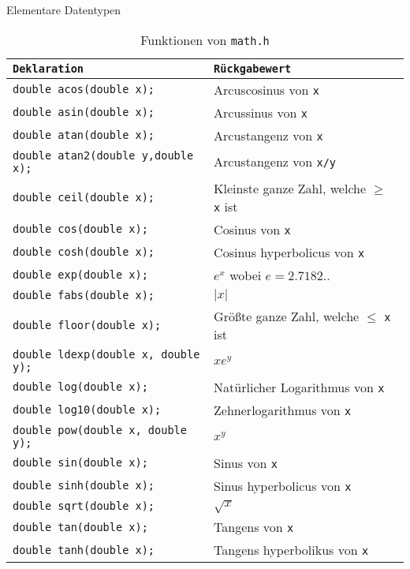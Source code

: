 \begin{table}[t]
\caption{Elementare Datentypen\label{tabelle1}}  %
\centering
\begin{tabular}{|l l|}
\hline
\texttt{Deklaration} & \texttt{Rückgabewert} \\
\hline
\texttt{double acos(double x);} & Arcuscosinus von \texttt{x}\\
\texttt{double asin(double x);} & Arcussinus von \texttt{x}\\
\texttt{double atan(double x);} & Arcustangenz von \texttt{x}\\
\texttt{double atan2(double y,double x);} & Arcustangenz von \texttt{x/y}\\
\texttt{double ceil(double x);} & Kleinste ganze Zahl, welche $\ge$ \texttt{x} ist \\
\texttt{double cos(double x);} & Cosinus von \texttt{x}\\
\texttt{double cosh(double x);} & Cosinus hyperbolicus von \texttt{x}\\
\texttt{double exp(double x);} & $e^{x}$ wobei $e=2.7182..$\\
\texttt{double fabs(double x);} & $\vert x\vert$\\
\texttt{double floor(double x);} & Größte ganze Zahl, welche $\le$ \texttt{x} ist \\
\texttt{double ldexp(double x, double y);} & $xe^{y}$ \\
\texttt{double log(double x);} & Natürlicher Logarithmus von \texttt{x}\\
\texttt{double log10(double x);} & Zehnerlogarithmus von \texttt{x}\\
\texttt{double pow(double x, double y);} & $x^{y}$\\
\texttt{double sin(double x);} & Sinus von \texttt{x}\\
\texttt{double sinh(double x);} & Sinus hyperbolicus von \texttt{x}\\
\texttt{double sqrt(double x);} & $\sqrt{x}$\\
\texttt{double tan(double x);} & Tangens von \texttt{x}\\
\texttt{double tanh(double x);} & Tangens hyperbolikus von \texttt{x}\\
\hline
\end{tabular}
\caption{Funktionen von \texttt{math.h}\label{math}}
\end{table}

